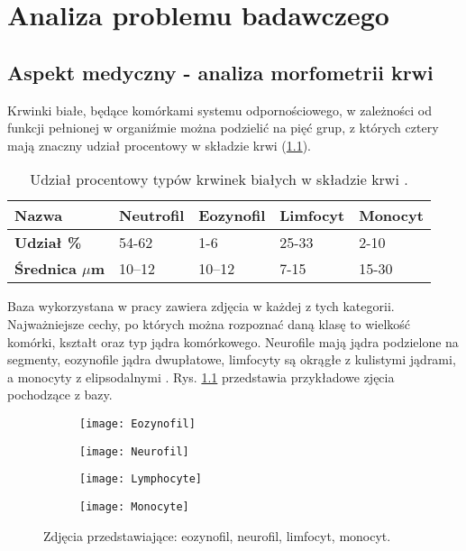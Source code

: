 \chapter{Analiza problemu badawczego}
\label{cha:analiza_problemu_badawczego}

\section{Aspekt medyczny - analiza morfometrii krwi}
Krwinki białe, będące komórkami systemu odpornościowego, w zależności od funkcji pełnionej w organiźmie można podzielić na pięć grup, z których cztery mają znaczny udział procentowy w składzie krwi (\ref{tab:blood_cells_percentage}).
\begin{table}[h]
\centering
\caption[Short Heading]{Udział procentowy typów krwinek białych w składzie krwi \cite{Wheater1979FunctionalHA}.}
\label{tab:blood_cells_percentage}
\begin{tabular}{|l|l|l|l|l|}
\hline
\textbf{Nazwa}                               & Neutrofil & Eozynofil & Limfocyt & Monocyt \\ \hline
\textbf{Udział \%} & 54-62   & 1-6    & 25-33  & 2-10  \\ \hline
\textbf{Średnica  \textbf{$\mu$}m} & 10–12  & 10–12 & 7-15  & 15-30  \\ \hline
\end{tabular}
\end{table}

{\parindent0pt %
Baza wykorzystana w pracy zawiera zdjęcia w każdej z tych kategorii. Najważniejsze cechy, po których można rozpoznać daną klasę to wielkość komórki, kształt oraz typ jądra komórkowego. Neurofile mają jądra podzielone na segmenty, eozynofile jądra dwupłatowe, limfocyty są okrągłe z kulistymi jądrami, a monocyty z elipsodalnymi \cite{lymphocytes_nucleus}. Rys. \ref{fig:subcaption_example} przedstawia przykładowe zjęcia pochodzące z bazy.
\begin{figure}[h]
	\centering
	\begin{subfigure}{0.35\textwidth}
		\centering
		\texttt{[image: Eozynofil]}
		\subcaption{\label{subfigure_a}}
	\end{subfigure}
	\begin{subfigure}{0.35\textwidth}
		\centering
		\texttt{[image: Neurofil]}
		\subcaption{\label{subfigure_b}}
	\end{subfigure}
	\begin{subfigure}{0.35\textwidth}
		\centering
		\texttt{[image: Lymphocyte]}
		\subcaption{\label{subfigure_c}}
	\end{subfigure}
	\begin{subfigure}{0.35\textwidth}
		\centering
		\texttt{[image: Monocyte]}
		\subcaption{\label{subfigure_d}}
	\end{subfigure}
	
	\caption{Zdjęcia przedstawiające: \protect{} eozynofil, \protect{} neurofil,  \protect{} limfocyt,  \protect{} monocyt.}
	\label{fig:subcaption_example}
\end{figure}
}

